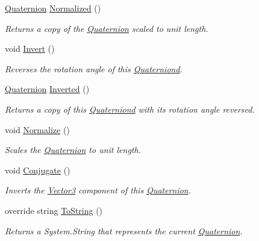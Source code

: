 \begin{DoxyCompactItemize}
\hyperlink{struct_open_t_k_1_1_quaternion}{Quaternion} \hyperlink{struct_open_t_k_1_1_quaternion_acbd0d16744065bf333d842d482460e26}{Normalized} ()
\begin{DoxyCompactList}\small\item\em Returns a copy of the \hyperlink{struct_open_t_k_1_1_quaternion}{Quaternion} scaled to unit length. \end{DoxyCompactList}\item 
void \hyperlink{struct_open_t_k_1_1_quaternion_aa72d00779d1c9f5de9c6cbb7cc460f08}{Invert} ()
\begin{DoxyCompactList}\small\item\em Reverses the rotation angle of this \hyperlink{struct_open_t_k_1_1_quaterniond}{Quaterniond}. \end{DoxyCompactList}\item 
\hyperlink{struct_open_t_k_1_1_quaternion}{Quaternion} \hyperlink{struct_open_t_k_1_1_quaternion_a8c595f7a501f568fbb1bc15f783847dd}{Inverted} ()
\begin{DoxyCompactList}\small\item\em Returns a copy of this \hyperlink{struct_open_t_k_1_1_quaterniond}{Quaterniond} with its rotation angle reversed. \end{DoxyCompactList}\item 
void \hyperlink{struct_open_t_k_1_1_quaternion_a39c08673d20b47daeb30691cc9b887e0}{Normalize} ()
\begin{DoxyCompactList}\small\item\em Scales the \hyperlink{struct_open_t_k_1_1_quaternion}{Quaternion} to unit length. \end{DoxyCompactList}\item 
void \hyperlink{struct_open_t_k_1_1_quaternion_ad2a8d218e87e0d7351e190f79bd9a6d3}{Conjugate} ()
\begin{DoxyCompactList}\small\item\em Inverts the \hyperlink{struct_open_t_k_1_1_vector3}{Vector3} component of this \hyperlink{struct_open_t_k_1_1_quaternion}{Quaternion}. \end{DoxyCompactList}\item 
override string \hyperlink{struct_open_t_k_1_1_quaternion_a234a78961f6168602932a391543bb517}{To\-String} ()
\begin{DoxyCompactList}\small\item\em Returns a System.\-String that represents the current \hyperlink{struct_open_t_k_1_1_quaternion}{Quaternion}. \end{DoxyCompactList}\item 

\end{DoxyCompactItemize}
